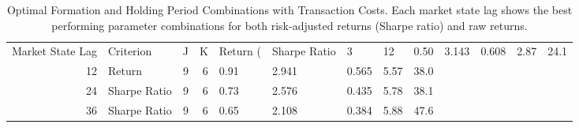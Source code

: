 \begin{table}[htbp]
\caption{Optimal Formation and Holding Period Combinations with Transaction Costs. Each market state lag shows the best performing parameter combinations for both risk-adjusted returns (Sharpe ratio) and raw returns.}
\label{tab:optimal_configs_costs}
\begin{tabular}{rlrrlllll}
\toprule
Market State Lag & Criterion & J & K & Return (%
 & Sharpe Ratio & 3 & 12 & 0.50 & 3.143 & 0.608 & 2.87 & 24.1 \\
12 & Return & 9 & 6 & 0.91 & 2.941 & 0.565 & 5.57 & 38.0 \\
24 & Sharpe Ratio & 9 & 6 & 0.73 & 2.576 & 0.435 & 5.78 & 38.1 \\
36 & Sharpe Ratio & 9 & 6 & 0.65 & 2.108 & 0.384 & 5.88 & 47.6 \\
\bottomrule
\end{tabular}
\end{table}

